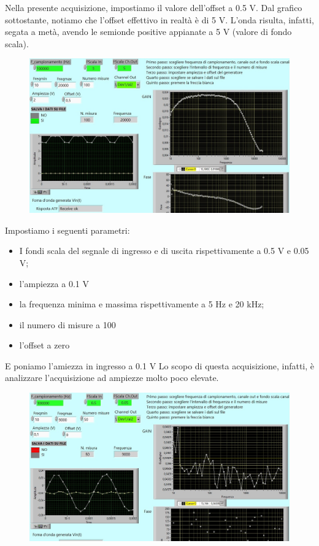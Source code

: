 Nella presente acquisizione, impostiamo il valore dell'offset a 0.5 V. Dal grafico sottostante, notiamo che l'offset effettivo in realtà è di 5 V. L'onda risulta, infatti, segata a metà, avendo le semionde positive appianate a 5 V (valore di fondo scala).

\begin{figure}[H]
\caption{}
    \includegraphics[width=12cm]{settimana_2/immagini/rccr_11.jpg}
    \centering
\end{figure}

Impostiamo i seguenti parametri:
\begin{itemize}
    \item I fondi scala del segnale di ingresso e di uscita rispettivamente a 0.5 V e 0.05 V;
    \item l'ampiezza a 0.1 V
    \item la frequenza minima e massima rispettivamente a 5 Hz e 20 kHz;
    \item il numero di misure a 100
    \item l'offset a zero
\end{itemize} E poniamo l'amiezza in ingresso a 0.1 V
Lo scopo di questa acquisizione, infatti, è analizzare l'acquisizione ad ampiezze molto poco elevate. 

\begin{figure}[H]
\caption{}
    \includegraphics[width=12cm]{settimana_2/immagini/rccr_13.jpg}
    \centering
\end{figure}

